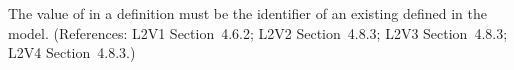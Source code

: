 The value of  in a \Species definition must be the
identifier of an existing \Compartment defined in the model.  (References:
L2V1 Section~4.6.2; L2V2 Section~4.8.3; L2V3 Section~4.8.3; L2V4 Section~4.8.3.)
